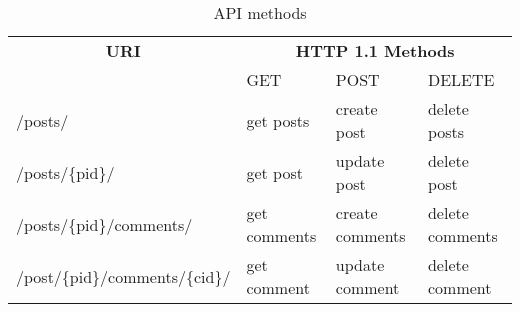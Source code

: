 \begin{table*}
    \centering
    \begin{tabular}{*{4}l}
        \toprule
        \multicolumn{1}{c}{\textbf{URI}} & \multicolumn{3}{c}{\textbf{HTTP 1.1 Methods}} \\
        \cmidrule{2-4}
        & GET & POST & DELETE \\
        \midrule
        /posts/ & get posts & create post & delete posts \\
        /posts/\{pid\}/ & get post & update post & delete post \\
        /posts/\{pid\}/comments/ & get comments & create comments & delete comments \\
        /post/\{pid\}/comments/\{cid\}/ & get comment & update comment & delete comment \\
        \bottomrule
    \end{tabular}
    \caption{API methods}
    \label{tab:api}
\end{table*}
